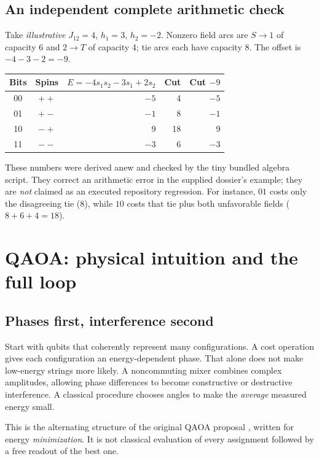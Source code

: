 \documentclass[11pt,letterpaper]{article}
\begin{document}
\subsection{An independent complete arithmetic check}
Take \emph{illustrative} $J_{12}=4$, $h_1=3$, $h_2=-2$. Nonzero field arcs are $S\to1$ of capacity 6 and $2\to T$ of capacity 4; tie arcs each have capacity 8. The offset is $-4-3-2=-9$.
\begin{center}\begin{tabular}{@{}ccrrr@{}}\toprule
Bits & Spins & $E=-4s_1s_2-3s_1+2s_2$ & Cut & Cut $-9$\\\midrule
00 & $++$ & $-5$ & 4 & $-5$\\
01 & $+-$ & $-1$ & 8 & $-1$\\
10 & $-+$ & 9 & 18 & 9\\
11 & $--$ & $-3$ & 6 & $-3$\\\bottomrule
\end{tabular}\end{center}
These numbers were derived anew and checked by the tiny bundled algebra script. They correct an arithmetic error in the supplied dossier's example; they are \emph{not} claimed as an executed repository regression. For instance, $01$ costs only the disagreeing tie (8), while $10$ costs that tie plus both unfavorable fields ($8+6+4=18$).
\section{QAOA: physical intuition and the full loop}\label{sec:qaoa}
\subsection{Phases first, interference second}
Start with qubits that coherently represent many configurations. A cost operation gives each configuration an energy-dependent phase. That alone does not make low-energy strings more likely. A noncommuting mixer combines complex amplitudes, allowing phase differences to become constructive or destructive interference. A classical procedure chooses angles to make the \emph{average} measured energy small.

This is the alternating structure of the original QAOA proposal \cite{farhi2014}, written for energy \emph{minimization}. It is not classical evaluation of every assignment followed by a free readout of the best one.
\end{document}
